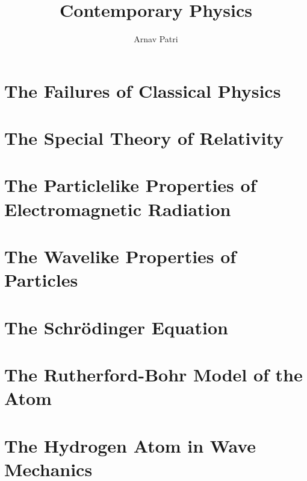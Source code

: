 \documentclass[12pt, A4]{report}
\title{Contemporary Physics}
\author{Arnav Patri}
\begin{document}
	\maketitle
	\tableofcontents
	\chapter{The Failures of Classical Physics}
		
	\chapter{The Special Theory of Relativity}
		
	\chapter{The Particlelike Properties of Electromagnetic Radiation}
		
	\chapter{The Wavelike Properties of Particles}
		
	\chapter{The Schr\"odinger Equation}
		
	\chapter{The Rutherford-Bohr Model of the Atom}
		
	\chapter{The Hydrogen Atom in Wave Mechanics}
		
\end{document}
